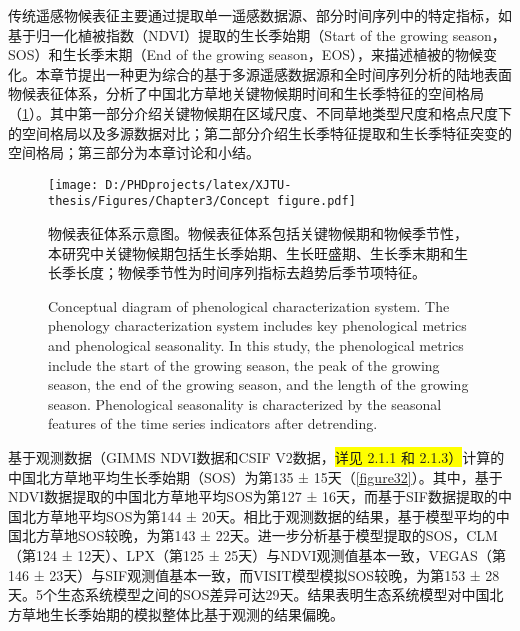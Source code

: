 

传统遥感物候表征主要通过提取单一遥感数据源、部分时间序列中的特定指标，如基于归一化植被指数（NDVI）提取的生长季始期（Start of the growing season，SOS）和生长季末期（End of the growing season，EOS），来描述植被的物候变化。本章节提出一种更为综合的基于多源遥感数据源和全时间序列分析的陆地表面物候表征体系，分析了中国北方草地关键物候期时间和生长季特征的空间格局（\cref{figure31}）。其中第一部分介绍关键物候期在区域尺度、不同草地类型尺度和格点尺度下的空间格局以及多源数据对比；第二部分介绍生长季特征提取和生长季特征突变的空间格局；第三部分为本章讨论和小结。

\begin{figure}[h]
  \centering
  \texttt{[image: D:/PHDprojects/latex/XJTU-thesis/Figures/Chapter3/Concept figure.pdf]}
  \caption{物候表征体系示意图。物候表征体系包括关键物候期和物候季节性，本研究中关键物候期包括生长季始期、生长旺盛期、生长季末期和生长季长度；物候季节性为时间序列指标去趋势后季节项特征。}
  \label{figure31}
  \addtocounter{figure}{-1}
  \vspace{5pt}
  \renewcommand{\figurename}{Fig}
  \caption{Conceptual diagram of phenological characterization system. The phenology characterization system includes key phenological metrics and phenological seasonality. In this study, the phenological metrics include the start of the growing season, the peak of the growing season, the end of the growing season, and the length of the growing season. Phenological seasonality is characterized by the seasonal features of the time series indicators after detrending.}
\end{figure}


基于观测数据（GIMMS NDVI数据和CSIF V2数据，\colorbox{yellow}{详见 2.1.1 和 2.1.3）}计算的中国北方草地平均生长季始期（SOS）为第135 ± 15天（\cref{figure32}）。其中，基于NDVI数据提取的中国北方草地平均SOS为第127 ± 16天，而基于SIF数据提取的中国北方草地平均SOS为第144 ± 20天。相比于观测数据的结果，基于模型平均的中国北方草地SOS较晚，为第143 ± 22天。进一步分析基于模型提取的SOS，CLM（第124 ± 12天）、LPX（第125 ± 25天）与NDVI观测值基本一致，VEGAS（第146 ± 23天）与SIF观测值基本一致，而VISIT模型模拟SOS较晚，为第153 ± 28天。5个生态系统模型之间的SOS差异可达29天。结果表明生态系统模型对中国北方草地生长季始期的模拟整体比基于观测的结果偏晚。

